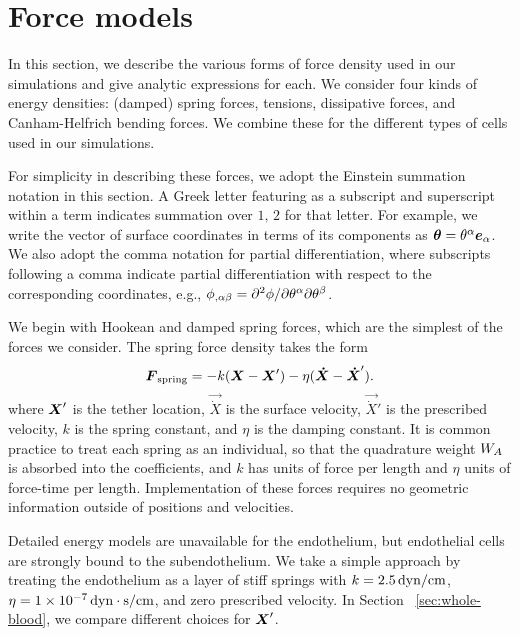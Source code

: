 \section{Force models}\label{sec:force}

In this section, we describe the various forms of force density used in our simulations
and give analytic expressions for each. We consider four kinds of energy densities:
(damped) spring forces, tensions, dissipative forces, and Canham-Helfrich bending forces.
We combine these for the different types of cells used in our simulations.

For simplicity in describing these forces, we adopt the Einstein summation notation in
this section. A Greek letter featuring as a subscript and superscript within a term
indicates summation over ${1,\,2}$ for that letter. For example, we write the vector of
surface coordinates in terms of its components as $\qs = \q[\alpha]\e_\alpha$. We also
adopt the comma notation for partial differentiation, where subscripts following a comma
indicate partial differentiation with respect to the corresponding coordinates, e.g.,
$\phi_{,\alpha\beta} = \partial^2\phi/\partial\q[\alpha]\partial\q[\beta]$.

We begin with Hookean and damped spring forces, which are the simplest of the forces we
consider. The spring force density takes the form
\begin{equation}
    \boldsymbol{F}_\text{spring} = -k (\boldsymbol{X} - \boldsymbol{X}') - \eta(\boldsymbol{\dot{X}}-\boldsymbol{\dot{X}}').
\end{equation}
where $\boldsymbol{X}'$ is the tether location, $\vec{\dot{X}}$ is the surface velocity,
$\vec{\dot{X}}'$ is the prescribed velocity, $k$ is the spring constant, and $\eta$ is
the damping constant.  It is common practice to treat each spring as an individual, so
that the quadrature weight $\weight[A]$ is absorbed into the coefficients, and $k$ has
units of force per length and $\eta$ units of force-time per length. Implementation of
these forces requires no geometric information outside of positions and velocities.

Detailed energy models are unavailable for the endothelium, but endothelial cells are
strongly bound to the subendothelium. We take a simple approach by treating the
endothelium as a layer of stiff springs with $k = 2.5\dynpercm$,
$\eta = \scinot{1}{-7}\dynsecpercm$, and zero prescribed velocity. In Section~%
\ref{sec:whole-blood}, we compare different choices for $\boldsymbol{X}'$.


